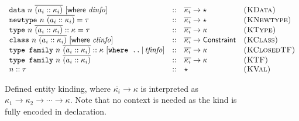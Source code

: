 \begin{figure}

\[
\begin{array}{lcll}
\texttt{data}~n~\overline{(a_i :: \kappa_i)} ~[\textsf{where}~ \mathit{dinfo}] &::& \overline{\kappa_i} \rightarrow \star & \textsc{(KData)}
\\
\texttt{newtype}~n~\overline{(a_i :: \kappa_i)} = \tau &::& \overline{\kappa_i} \rightarrow \star & \textsc{(KNewtype)}
\\
\texttt{type}~n~\overline{(a_i :: \kappa_i)} :: \kappa = \tau &::& \overline{\kappa_i} \rightarrow \kappa & \textsc{(KType)}
\\
\texttt{class}~n~\overline{(a_i :: \kappa_i)} ~[\textsf{where}~ \mathit{clinfo}] &::& \overline{\kappa_i} \rightarrow \textsf{Constraint} & \textsc{(KClass)}
\\
\texttt{type family}~n~\overline{(a_i :: \kappa_i)} :: \kappa ~[\texttt{where ..} \,|\, \mathit{tfinfo}] &::& \overline{\kappa_i} \rightarrow \kappa & \textsc{(KClosedTF)}
\\
\texttt{type family}~n~\overline{(a_i :: \kappa_i)} &::& \overline{\kappa_i} \rightarrow \kappa & \textsc{(KTF)}
\\
n :: \tau &::& \star & \textsc{(KVal)}
\end{array}
\]
\caption{Defined entity kinding, where $\overline{\kappa_i} \rightarrow \kappa$ is interpreted as $\kappa_1 \rightarrow \kappa_2 \rightarrow \cdots \rightarrow \kappa$.  Note that no context is needed as the kind is fully encoded in declaration.}
\end{figure}
